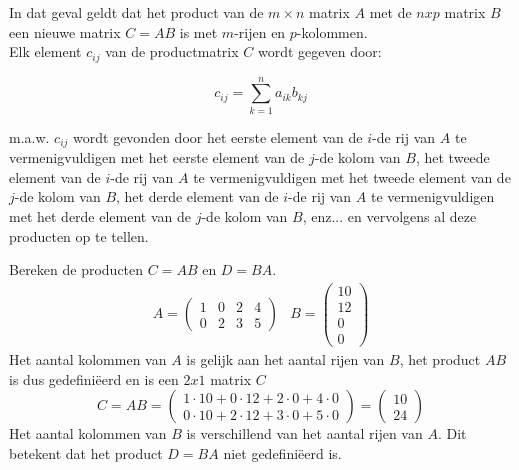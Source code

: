 In dat geval geldt dat het product van de $m \times n$ matrix $A$ met de $nxp$ matrix $B$ een nieuwe matrix $C=AB$ is met $m$-rijen en $p$-kolommen.\\
Elk element $c_{ij}$ van de productmatrix $C$ wordt gegeven door:

\[ c_{ij}=\sum\limits_{k=1}^{n} a_{ik}b_{kj}    \]


m.a.w. $c_{ij}$ wordt gevonden door het eerste element van de $i$-de rij van $A$ te vermenigvuldigen met het eerste element van de $j$-de kolom van $B$, het tweede element van de $i$-de rij van $A$ te vermenigvuldigen met het tweede element van de $j$-de kolom van $B$, het derde element van de $i$-de rij van $A$ te vermenigvuldigen met het derde element van de $j$-de kolom van $B$, enz... en vervolgens al deze producten op te tellen.\\


\begin{voorbeeld}
		Bereken de producten $C=AB$ en $D=BA$.
	\[
	\begin{array}{ll}
		A=\left( \begin{matrix}
			1 & 0 & 2 & 4 \\
			0 & 2 & 3 & 5 \end{matrix} \right) &
		B=\left( \begin{matrix}
			10 \\ 12 \\ 0 \\ 0
		\end{matrix} \right)
	\end{array}	
	\]
	Het aantal kolommen van $A$ is gelijk aan het aantal rijen van $B$, het product $AB$ is dus gedefini\"{e}erd en is een $2x1$ matrix $C$
	\[
	C=AB=\left( \begin{matrix} 
	1\cdot 10+0\cdot 12+2\cdot 0+4\cdot 0 \\
	0\cdot 10+2\cdot 12+3\cdot 0+5\cdot 0 \end{matrix} \right)=
	\left( \begin{matrix}
	10 \\ 24
	\end{matrix} \right)
	\]
	Het aantal kolommen van $B$ is verschillend van het aantal rijen van $A$. Dit betekent dat het product $D=BA$ niet gedefini\"{e}erd is.
	
\end{voorbeeld}

